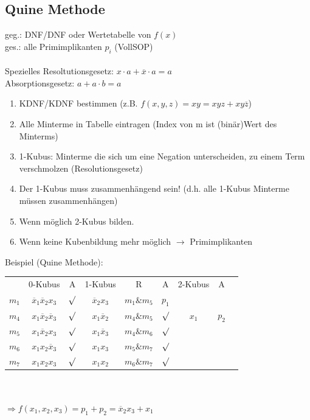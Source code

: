 \documentclass[6pt,a4paper]{scrartcl}
\newcommand{\ol}[1]{\ensuremath{\overline{#1}}}									%
\newcommand{\Ra}[0]{\ensuremath{\Rightarrow}}									%
\newcommand{\ra}[0]{\ensuremath{\rightarrow}} 									%
\begin{document}
\begin{multicols*}{3}
	\subsection{Quine Methode}
	geg.: DNF/DNF oder Wertetabelle von $f(x)$ \\
	ges.: alle Primimplikanten $p_i$ (VollSOP)  \\ \\
	Spezielles Resoltutionsgesetz: $x\cdot a + \overline x \cdot a = a$ \\
	Absorptionsgesetz: $a + a\cdot b = a$

	\begin{enumerate}
		\item KDNF/KDNF bestimmen (z.B. $f(x,y,z) = xy = xyz + xy\overline z$)
		\item Alle Minterme in Tabelle eintragen (Index von m ist (binär)Wert des Minterms)
		\item 1-Kubus: Minterme die sich um eine Negation unterscheiden, zu einem Term verschmolzen (Resolutionsgesetz)
		\item Der 1-Kubus muss zusammenhängend sein! (d.h. alle 1-Kubus Minterme müssen zusammenhängen)
		\item Wenn möglich 2-Kubus bilden.
		\item Wenn keine Kubenbildung mehr möglich $\ra$ Primimplikanten
	\end{enumerate}
	Beispiel (Quine Methode):

	\begin{tabular}{l | c | c  || c | c | c || c | c | r}
	      & 0-Kubus & A & 1-Kubus & R & A & 2-Kubus  & A \\
	$m_1$ & $\overline x_1 \overline x_2 x_3$ & $\surd$ & $\overline x_2 x_3$ & $m_1 \& m_5$ & $p_1$ & &\\
	$m_4$ & $x_1 \overline x_2 \overline x_3$ & $\surd$ & $x_1 \overline x_2$ & $m_4 \& m_5$ & $\surd$ & $x_1$ &   $p_2$\\
	$m_5$ & $x_1 \overline x_2  x_3$ & $\surd$  & $x_1 \overline x_3$ & $m_4 \& m_6$ & $\surd$& &\\
	$m_6$ & $x_1 x_2 \overline x_3$ & $ \surd$ & $x_1 x_3$ & $ m_5 \& m_7$ & $ \surd$ & &\\
	$m_7$ & $x_1 x_2 x_3$ & $\surd$ & $x_1 x_2$ & $m_6 \& m_7 $ & $ \surd$ & &\\
	\end{tabular} \\ \\
	$\Ra f(x_1,x_2,x_3)=p_1+p_2=\ol x_2x_3 + x_1$


\end{multicols*}
\end{document}
